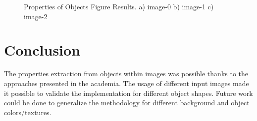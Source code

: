 \documentclass[]{IEEEtran}
\begin{document}
\begin{figure}[]
  \centering
  \caption{Properties of Objects Figure Results. a) image-0 b) image-1 c) image-2}
  \label{fig:labeled}
\end{figure}

\section{Conclusion}
The properties extraction from objects within images was possible thanks to the approaches presented in the academia.
The usage of different input images made it possible to validate the implementation for different object shapes. Future work could be done to generalize the methodology for different background and object colors/textures. 



\end{document}
